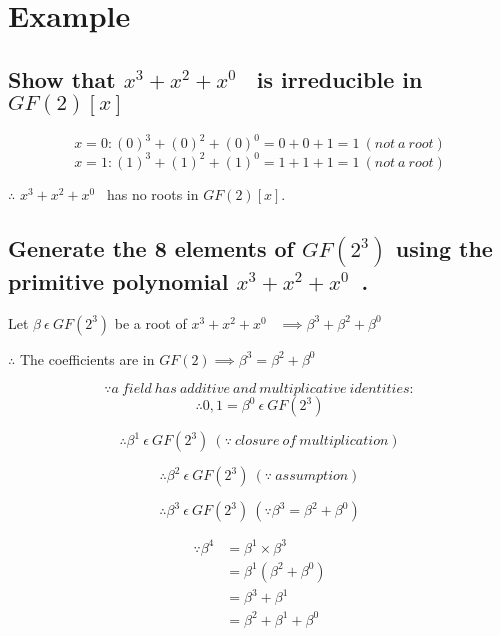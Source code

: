 \documentclass[paper=usletter, fontsize=12pt]{article}
\newcommand{\polynomial}{$x^{3}+x^{2}+x^{0}$}
\begin{document}
    \section{Example}
        \subsection{Show that \polynomial~ is irreducible in $GF(2)[x]$}

            \[ x=0: (0)^{3}+(0)^{2}+(0)^{0}=0+0+1=1 \ (not \ a \ root) \]
            \[ x=1: (1)^{3}+(1)^{2}+(1)^{0}=1+1+1=1 \ (not \ a \ root) \]
            \centerline{$\therefore$ \polynomial~ has no roots in $GF(2)[x]$.}

        \subsection{Generate the 8 elements of $GF(2^{3})$ using the primitive polynomial \polynomial~.}

            \centerline{Let $\beta \ \epsilon \ GF(2^{3})$ be a root of \polynomial~ $\implies \beta^{3}+\beta^{2}+\beta^{0}$}

            \hspace*{\fill}
            \centerline{$\therefore$ The coefficients are in $GF(2) \implies \beta^{3}=\beta^{2}+\beta^{0}$}

            \[ \because a \ field \ has \ additive \ and \ multiplicative \ identities: \]
            \[ \therefore 0, 1=\beta^{0} \ \epsilon \ GF(2^{3}) \]

            \[ \therefore \beta^{1} \ \epsilon \ GF(2^{3}) \ (\because \ closure \ of \ multiplication) \]

            \[ \therefore \beta^{2} \ \epsilon \ GF(2^{3}) \ (\because \ assumption) \]

            \[ \therefore \beta^{3} \ \epsilon \ GF(2^{3}) \ (\because \beta^{3}=\beta^{2}+\beta^{0}) \]

            \begin{equation*}
                \begin{split}
                    \because \beta^{4} & = \beta^{1} \times \beta^{3} \\
                    & = \beta^{1} (\beta^{2}+\beta^{0}) \\
                    & = \beta^{3}+\beta^{1} \\
                    & = \beta^{2}+\beta^{1}+\beta^{0}
                \end{split}
            \end{equation*}
\end{document}
